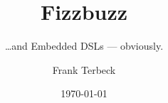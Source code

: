 \title{Fizzbuzz}
\subtitle{{\tiny \dots{}and Embedded DSLs --- obviously.}}
\author{Frank Terbeck}
\date{\today}

